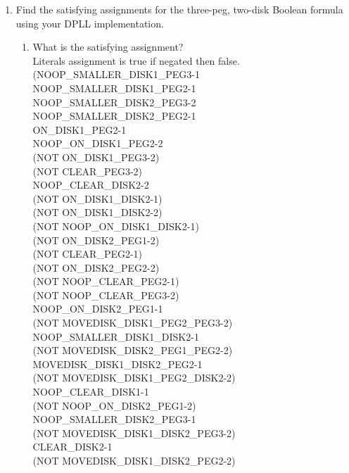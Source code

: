 \documentclass[12pt,letterpaper]{ntdhw}
\begin{document}
\begin{enumerate}
  \item Find the satisfying assignments for the three-peg, two-disk
    Boolean formula using your DPLL implementation.
    \begin{enumerate}
    \item What is the satisfying assignment?
       \\Literals assignment is true if negated then false.
\\(NOOP\_SMALLER\_DISK1\_PEG3\mbox{-}1 
\\NOOP\_SMALLER\_DISK1\_PEG2\mbox{-}1 
\\NOOP\_SMALLER\_DISK2\_PEG3\mbox{-}2
\\NOOP\_SMALLER\_DISK2\_PEG2\mbox{-}1 
\\ON\_DISK1\_PEG2\mbox{-}1 
\\NOOP\_ON\_DISK1\_PEG2\mbox{-}2
\\(NOT ON\_DISK1\_PEG3\mbox{-}2) 
\\(NOT CLEAR\_PEG3\mbox{-}2) 
\\NOOP\_CLEAR\_DISK2\mbox{-}2
\\(NOT ON\_DISK1\_DISK2\mbox{-}1) 
\\(NOT ON\_DISK1\_DISK2\mbox{-}2) 
\\(NOT NOOP\_ON\_DISK1\_DISK2\mbox{-}1)
\\(NOT ON\_DISK2\_PEG1\mbox{-}2) 
\\(NOT CLEAR\_PEG2\mbox{-}1) 
\\(NOT ON\_DISK2\_PEG2\mbox{-}2)
\\(NOT NOOP\_CLEAR\_PEG2\mbox{-}1) 
\\(NOT NOOP\_CLEAR\_PEG3\mbox{-}2) 
\\NOOP\_ON\_DISK2\_PEG1\mbox{-}1
\\(NOT MOVEDISK\_DISK1\_PEG2\_PEG3\mbox{-}2) 
\\NOOP\_SMALLER\_DISK1\_DISK2\mbox{-}1
\\(NOT MOVEDISK\_DISK2\_PEG1\_PEG2\mbox{-}2) 
\\MOVEDISK\_DISK1\_DISK2\_PEG2\mbox{-}1
\\(NOT MOVEDISK\_DISK1\_PEG2\_DISK2\mbox{-}2) 
\\NOOP\_CLEAR\_DISK1\mbox{-}1
\\(NOT NOOP\_ON\_DISK2\_PEG1\mbox{-}2) 
\\NOOP\_SMALLER\_DISK2\_PEG3\mbox{-}1
\\(NOT MOVEDISK\_DISK1\_DISK2\_PEG3\mbox{-}2) 
\\CLEAR\_DISK2\mbox{-}1
\\(NOT MOVEDISK\_DISK1\_DISK2\_PEG2\mbox{-}2) 

\end{enumerate}
\end{enumerate}
\end{document}
